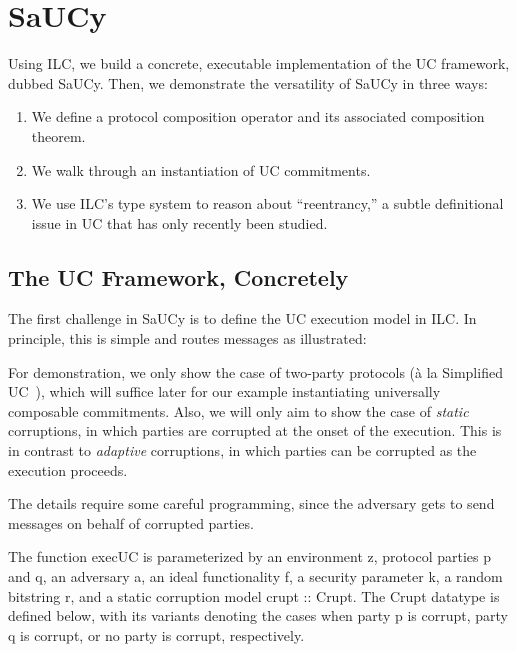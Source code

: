 \section{SaUCy}
\label{sec:saucy}

Using ILC, we build a concrete, executable implementation of the UC framework,
dubbed SaUCy. Then, we demonstrate the versatility of SaUCy in three ways:
\begin{enumerate}[leftmargin=*]
\item We define a protocol composition operator and its associated composition theorem.
\item We walk through an instantiation of UC commitments.
\item We use ILC's type system to reason about ``reentrancy,'' a subtle definitional issue in UC that has only recently been studied.
\end{enumerate}

\subsection{The UC Framework, Concretely}
\label{subsec:concrete-uc}
The first challenge in SaUCy is to define the UC execution model in ILC.
In principle, this is simple and routes messages as illustrated:


For demonstration, we only show the case of two-party protocols (\`{a}
la Simplified UC~\cite{canetti2015simpler}), which will suffice later for our example
instantiating universally composable commitments.
Also, we will only aim to show the case of \emph{static} corruptions, in which
parties are corrupted at the onset of the execution. This is in contrast to
\emph{adaptive} corruptions, in which parties can be corrupted as the
execution proceeds.

The details require some careful programming, since the adversary gets to send messages on behalf of corrupted parties.

\noindent
The function \textsf{execUC} is parameterized by an environment \textsf{z},
protocol parties \textsf{p} and \textsf{q}, an adversary \textsf{a}, an ideal
functionality \textsf{f}, a security parameter \textsf{k}, a random bitstring
\textsf{r}, and a static corruption model \textsf{crupt :: Crupt}. The
\textsf{Crupt} datatype is defined below, with its variants denoting the cases
when party \textsf{p} is corrupt, party \textsf{q} is corrupt, or no party is
corrupt, respectively.

